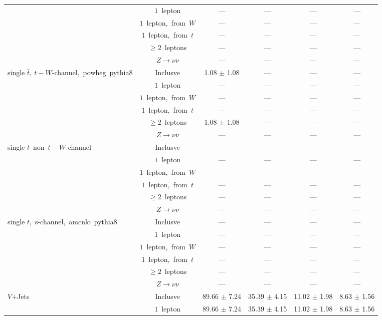 \documentclass{article}
\begin{document}
\begin{longtable}{|l|c|c|c|c|c|}
 & $1$~lepton  & ---  & ---  & ---  & --- \\* 
 & $1$~lepton,~from~$W$  & ---  & ---  & ---  & --- \\* 
 & $1$~lepton,~from~$t$  & ---  & ---  & ---  & --- \\* 
 & $\ge2$~leptons  & ---  & ---  & ---  & --- \\* 
 & $Z\rightarrow\nu\nu$  & ---  & ---  & ---  & --- \\* 
\hline 
\multirow{6}{*}{single $\bar{t},~t-W$-channel,~powheg~pythia8} & Inclusve  & 1.08 $\pm$ 1.08  & ---  & ---  & --- \\* 
 & $1$~lepton  & ---  & ---  & ---  & --- \\* 
 & $1$~lepton,~from~$W$  & ---  & ---  & ---  & --- \\* 
 & $1$~lepton,~from~$t$  & ---  & ---  & ---  & --- \\* 
 & $\ge2$~leptons  & 1.08 $\pm$ 1.08  & ---  & ---  & --- \\* 
 & $Z\rightarrow\nu\nu$  & ---  & ---  & ---  & --- \\* 
\hline 
\multirow{6}{*}{single $t$~non~$t-W$-channel} & Inclusve  & ---  & ---  & ---  & --- \\* 
 & $1$~lepton  & ---  & ---  & ---  & --- \\* 
 & $1$~lepton,~from~$W$  & ---  & ---  & ---  & --- \\* 
 & $1$~lepton,~from~$t$  & ---  & ---  & ---  & --- \\* 
 & $\ge2$~leptons  & ---  & ---  & ---  & --- \\* 
 & $Z\rightarrow\nu\nu$  & ---  & ---  & ---  & --- \\* 
\hline 
\multirow{6}{*}{single $t$,~s-channel,~amcnlo~pythia8} & Inclusve  & ---  & ---  & ---  & --- \\* 
 & $1$~lepton  & ---  & ---  & ---  & --- \\* 
 & $1$~lepton,~from~$W$  & ---  & ---  & ---  & --- \\* 
 & $1$~lepton,~from~$t$  & ---  & ---  & ---  & --- \\* 
 & $\ge2$~leptons  & ---  & ---  & ---  & --- \\* 
 & $Z\rightarrow\nu\nu$  & ---  & ---  & ---  & --- \\* 
\hline 
\multirow{6}{*}{$V$+Jets} & Inclusve  & 89.66 $\pm$ 7.24  & 35.39 $\pm$ 4.15  & 11.02 $\pm$ 1.98  & 8.63 $\pm$ 1.56 \\* 
 & $1$~lepton  & 89.66 $\pm$ 7.24  & 35.39 $\pm$ 4.15  & 11.02 $\pm$ 1.98  & 8.63 $\pm$ 1.56 \\* 

\end{longtable}
\end{document}
